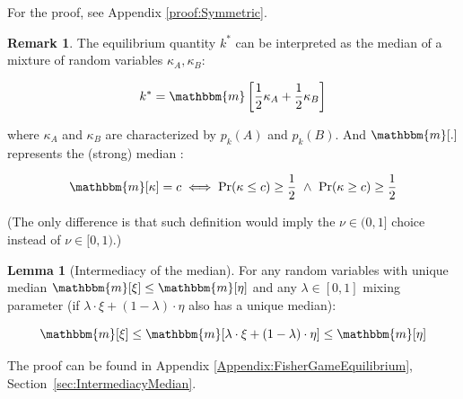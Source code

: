 \documentclass{article}
\theoremstyle{definition}
\newtheorem{lemma}{Lemma}[section]
\newtheorem*{remark}{Remark}
\begin{document}
For the proof, see Appendix \ref{proof:Symmetric}.

\begin{remark}
    The equilibrium quantity $k^*$ can be interpreted as the median \cite{book:DeGrootProbabilityAndStatistics,book:IntroToProbability} of a mixture of random variables $\kappa_A, \kappa_B$:

    \begin{equation}
        k^* = \mathbbm{m}
        \left [ \frac{1}{2} \kappa_A+
        \frac{1}{2}\kappa_B
        \right ]
    \end{equation}

    where $\kappa_A$ and $\kappa_B$ are characterized by $p_k(A)$ and $p_k(B)$. And $\mathbbm{m}[.]$ represents the (strong) median \cite{paper:BinomialMedianMode}:

    \begin{equation}
        \mathbbm{m}[\kappa] = c \iff
        \Pr(\kappa \le c) \ge \frac{1}{2}
        \ \wedge \  
        \Pr(\kappa \ge c) \ge \frac{1}{2}
    \end{equation}

    (The only difference is that such definition would imply the $\nu \in (0,1]$ choice instead of $\nu \in [0,1)$.)
    
\end{remark}

\begin{lemma}[Intermediacy of the median]
\label{lemma:IntermediacyMedian}
    For any random variables with unique median $\mathbbm{m}[\xi] \le \mathbbm{m}[\eta]$ and any $\lambda \in [0,1]$ mixing parameter (if $\lambda \cdot \xi + (1-\lambda) \cdot \eta$ also has a unique median):

    \begin{equation}
        \mathbbm{m}[\xi] 
        \le
        \mathbbm{m}[\lambda \cdot \xi + (1-\lambda) \cdot \eta]
        \le
        \mathbbm{m}[\eta] 
    \end{equation}
    
\end{lemma}

The proof can be found in Appendix \ref{Appendix:FisherGameEquilibrium}, Section~\ref{sec:IntermediacyMedian}.
\end{document}
